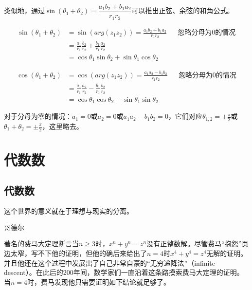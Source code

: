 \documentclass[b5paper]{ctexart}
\begin{document}
\begin{Answer}[ref={ex:complex}]
{类似地，通过$\sin(\theta_1 + \theta_2) = \dfrac{a_1b_2 + b_1a_2}{r_1r_2}$可以推出正弦、余弦的和角公式。

\begin{align*}
\sin(\theta_1 + \theta_2) &= \sin(arg(z_1z_2)) = \frac{a_1b_2 + b_1a_2}{r_1r_2} && \text{忽略分母为0的情况} \\
  &= \frac{a_1}{r_1}\frac{b_2}{r_2} + \frac{b_1}{r_1}\frac{a_2}{r_2} \\
  &= \cos\theta_1 \sin\theta_2 + \sin\theta_1 \cos\theta_2
\end{align*}

\begin{align*}
\cos(\theta_1 + \theta_2) &= \cos(arg(z_1z_2)) = \frac{a_1a_2 - b_1b_2}{r_1r_2} && \text{忽略分母为0的情况} \\
  &= \frac{a_1}{r_1}\frac{a_2}{r_2} - \frac{b_1}{r_1}\frac{b_2}{r_2} \\
  &= \cos\theta_1 \cos\theta_2 - \sin\theta_1 \sin\theta_2
\end{align*}

对于分母为零的情况：$a_1 = 0$或$a_2 = 0$或$a_1a_2 - b_1b_2 = 0$，它们对应$\theta_{1,2} = \pm \frac{\pi}{2}$或$\theta_1 + \theta_2 = \pm \frac{\pi}{2}$，这里略去。
}

\end{Answer}

\ifx\wholebook\relax
\chapter{代数数}
\else
\section{代数数}
\fi

\epigraph{这个世界的意义就在于理想与现实的分离。}{哥德尔}

\label{sec:FLT-4} 
著名的费马大定理断言当$n \geq 3$时，$x^n + y^n = z^n$没有正整数解。尽管费马“抱怨”页边太窄，写不下他的证明，但他的确后来给出了$n=4$时$x^4 + y^4 = z^4$无解的证明。并且他还在这个过程中发展出了自己非常自豪的“无穷递降法”（infinite descent）。在此后的200年间，数学家们一直沿着这条路摸索费马大定理的证明。当$n = 4$时，费马发现他只需要证明如下结论就足够了。
\end{document}
